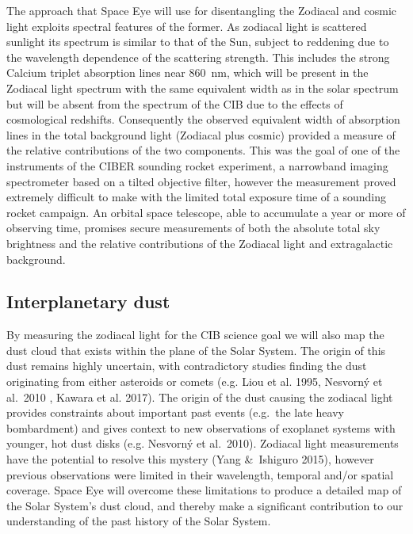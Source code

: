\documentclass[]{iac}
\begin{document}
The approach that Space Eye will use for disentangling the Zodiacal and cosmic light exploits spectral features of the
former. As zodiacal light is scattered sunlight its spectrum is similar to that of the Sun, subject to reddening due to
the wavelength dependence of the scattering strength\cite{Giavalisco2002,Aldering2001,Leinert1998}. This includes the
strong Calcium triplet absorption lines near \SI{860}{\nano\metre}, which will be present in the Zodiacal light
spectrum with the same equivalent width as in the solar spectrum but will be absent from the spectrum of the
CIB due to the effects of cosmological redshifts. Consequently the observed equivalent width of
absorption lines in the total background light (Zodiacal plus cosmic) provided a measure of the relative contributions
of the two components. This was the goal of one of the instruments of the CIBER sounding rocket
experiment\cite{Zemcov2013}, a narrowband imaging spectrometer based on a tilted objective filter\cite{Korngut2013},
however the measurement proved extremely difficult to make with the limited total exposure time of a sounding rocket
campaign. An orbital space telescope, able to accumulate a year or more of observing time, promises secure measurements
of both the absolute total sky brightness and the relative contributions of the Zodiacal light and extragalactic
background.

\subsection{Interplanetary dust}

By measuring the zodiacal light for the CIB science goal we will also map the dust cloud that exists within the plane
of the Solar System. The origin of this dust remains highly uncertain, with contradictory studies finding the dust
originating from either asteroids or comets (e.g. Liou et al. 1995\cite{Liou1995}, Nesvorn\'y et al.\ 2010
\cite{Nesvorny2010}, Kawara et al. 2017\cite{Kawara2017}). The origin of the dust causing the zodiacal light provides
constraints about important past events (e.g.\ the late heavy bombardment) and gives context to new observations of
exoplanet systems with younger, hot dust disks (e.g. Nesvorn\'y et al.\ 2010\cite{Nesvorny2010}). Zodiacal light
measurements have the potential to resolve this mystery (Yang \&\ Ishiguro 2015\cite{Yang2015}), however previous
observations were limited in their wavelength, temporal and/or spatial coverage. Space Eye will overcome these
limitations to produce a detailed map of the Solar System's dust cloud, and thereby make a significant contribution to
our understanding of the past history of the Solar System.
\end{document}
